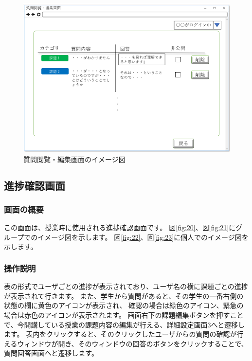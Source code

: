 \begin{figure}[htbp]
  \begin{center}
    \includegraphics[width=1\linewidth,clip]{./img/19.png}
    \caption{質問閲覧・編集画面のイメージ図}\label{fig:19}
  \end{center}
\end{figure}

\newpage

\subsection{進捗確認画面}
\subsubsection{画面の概要}
この画面は、授業時に使用される進捗確認画面です。
図\ref{fig:20}、図\ref{fig:21}にグループでのイメージ図を示します。
図\ref{fig:22}、図\ref{fig:23}に個人でのイメージ図を示します。

\subsubsection{操作説明}
表の形式でユーザごとの進捗が表示されており、ユーザ名の横に課題ごとの進捗が表示されて行きます。
また、学生から質問があると、その学生の一番右側の状態の欄に黄色のアイコンが表示され、
確認の場合は緑色のアイコン、緊急の場合は赤色のアイコンが表示されます。
画面右下の課題編集ボタンを押すことで、今開講している授業の課題内容の編集が行える、詳細設定画面3へと遷移します。
表内をクリックすると、そのクリックしたユーザからの質問の確認が行えるウィンドウが開き、そのウィンドウの回答のボタンをクリックすることで、
質問回答画面へと遷移します。

